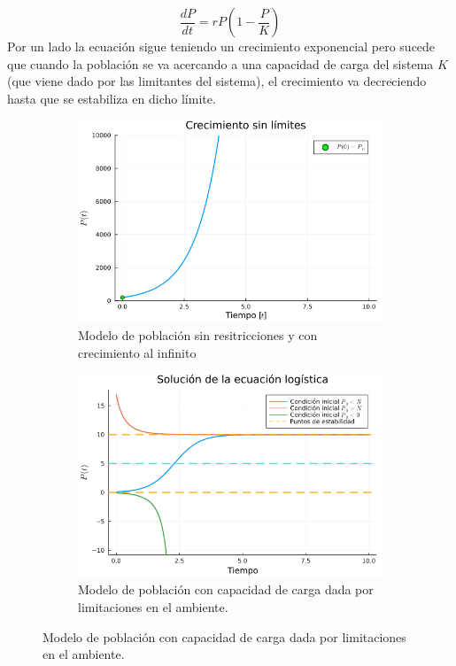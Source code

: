 \documentclass[11pt,a4paper]{article}
\begin{document}
\begin{equation}\label{eq:logistica}
\frac{dP}{dt}=rP\left(1-\frac{P}{K}\right)
\end{equation}
Por un lado la ecuación sigue teniendo un crecimiento exponencial pero sucede que cuando la población se va acercando a una capacidad de carga del sistema $K$ (que viene dado por las limitantes del sistema), el crecimiento va decreciendo hasta que se estabiliza en dicho límite.
\begin{figure}[t!]
        \centering
        \begin{subfigure}[h]{0.5\textwidth} 
            \includegraphics[width=\textwidth]{Crecimiento sin limites}
            \caption{Modelo de población sin resitricciones y con crecimiento al infinito}
            \label{fig:sinLim}
        \end{subfigure} 
        \hfill 
        \begin{subfigure}[h]{0.49\textwidth} 
            \includegraphics[width=\textwidth]{Ecuación logística}
            \caption{Modelo de población con capacidad de carga dada por limitaciones en el ambiente.}
            \label{fig:logistico}
        \end{subfigure}
\end{figure}
\end{document}

